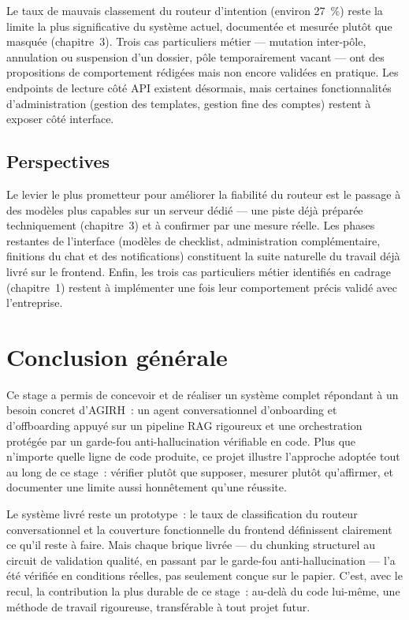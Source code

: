 \documentclass[12pt,a4paper]{article}
\begin{document}
Le taux de mauvais classement du routeur d'intention (environ 27~\%) reste la limite la plus significative du syst\`eme actuel, document\'ee et mesur\'ee plut\^ot que masqu\'ee (chapitre~3). Trois cas particuliers m\'etier --- mutation inter-p\^ole, annulation ou suspension d'un dossier, p\^ole temporairement vacant --- ont des propositions de comportement r\'edig\'ees mais non encore valid\'ees en pratique. Les endpoints de lecture c\^ot\'e API existent d\'esormais, mais certaines fonctionnalit\'es d'administration (gestion des templates, gestion fine des comptes) restent \`a exposer c\^ot\'e interface.

\subsection{Perspectives}

Le levier le plus prometteur pour am\'eliorer la fiabilit\'e du routeur est le passage \`a des mod\`eles plus capables sur un serveur d\'edi\'e --- une piste d\'ej\`a pr\'epar\'ee techniquement (chapitre~3) et \`a confirmer par une mesure r\'eelle. Les phases restantes de l'interface (mod\`eles de checklist, administration compl\'ementaire, finitions du chat et des notifications) constituent la suite naturelle du travail d\'ej\`a livr\'e sur le frontend. Enfin, les trois cas particuliers m\'etier identifi\'es en cadrage (chapitre~1) restent \`a impl\'ementer une fois leur comportement pr\'ecis valid\'e avec l'entreprise.

\newpage
\section*{Conclusion g\'en\'erale}

Ce stage a permis de concevoir et de r\'ealiser un syst\`eme complet r\'epondant \`a un besoin concret d'AGIRH~: un agent conversationnel d'onboarding et d'offboarding appuy\'e sur un pipeline RAG rigoureux et une orchestration prot\'eg\'ee par un garde-fou anti-hallucination v\'erifiable en code. Plus que n'importe quelle ligne de code produite, ce projet illustre l'approche adopt\'ee tout au long de ce stage~: v\'erifier plut\^ot que supposer, mesurer plut\^ot qu'affirmer, et documenter une limite aussi honn\^etement qu'une r\'eussite.

Le syst\`eme livr\'e reste un prototype~: le taux de classification du routeur conversationnel et la couverture fonctionnelle du frontend d\'efinissent clairement ce qu'il reste \`a faire. Mais chaque brique livr\'ee --- du chunking structurel au circuit de validation qualit\'e, en passant par le garde-fou anti-hallucination --- l'a \'et\'e v\'erifi\'ee en conditions r\'eelles, pas seulement con\c{c}ue sur le papier. C'est, avec le recul, la contribution la plus durable de ce stage~: au-del\`a du code lui-m\^eme, une m\'ethode de travail rigoureuse, transf\'erable \`a tout projet futur.
\end{document}
